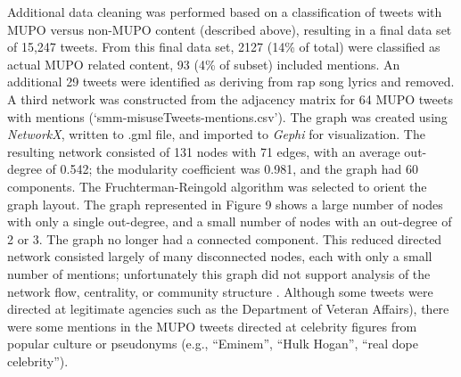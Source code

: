 \documentclass[sigconf]{acmart}
\begin{document}
Additional data cleaning was performed based on a classification of tweets
with MUPO versus non-MUPO content (described above), resulting in a final data 
set of 15,247 tweets. From this final data set, 2127 (14\% of total) were 
classified as actual MUPO related content, 93 (4\% of subset) included mentions. 
An additional 29 tweets were identified as deriving from rap song lyrics and 
removed. A third network was constructed from the adjacency matrix for 64 MUPO 
tweets with mentions (`smm-misuseTweets-mentions.csv'). The graph was created 
using \emph{NetworkX}, written to .gml file, and imported to \emph{Gephi} for 
visualization. The resulting network consisted of 131 nodes with 71 edges, with 
an average out-degree of 0.542; the modularity coefficient was 0.981, and the 
graph had 60 components. The Fruchterman-Reingold algorithm was selected to 
orient the graph layout. The graph represented in Figure 9 shows a large number 
of nodes with only a single out-degree, and a small number of nodes with an 
out-degree of 2 or 3. The graph no longer had a connected component. This 
reduced directed network consisted largely of many disconnected nodes, each 
with only a small number of mentions; unfortunately this graph did not support 
analysis of the network flow, centrality, or community structure 
\cite{golbeck13, zafarani14}. Although some tweets were directed at legitimate 
agencies such as the Department of Veteran Affairs), there were some mentions 
in the MUPO tweets directed at celebrity figures from popular culture or 
pseudonyms (e.g., ``Eminem'', ``Hulk Hogan'', ``real dope celebrity''). 
\end{document}
